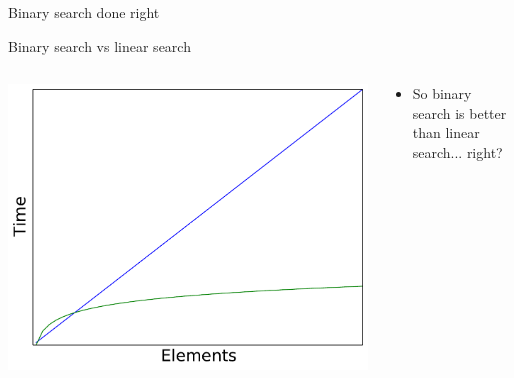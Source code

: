 \begin{frame}{Binary search done right}
	
\end{frame}

\begin{frame}{Binary search vs linear search}
	\begin{columns}
		\begin{column}{0.45\textwidth}
			\includegraphics[width=\textwidth]{plot2_linear_log}
		\end{column}
		\begin{column}{0.55\textwidth}
			\begin{itemize}
				\item So binary search is better than linear search... right?
			\end{itemize}
		\end{column}
	\end{columns}
\end{frame}

